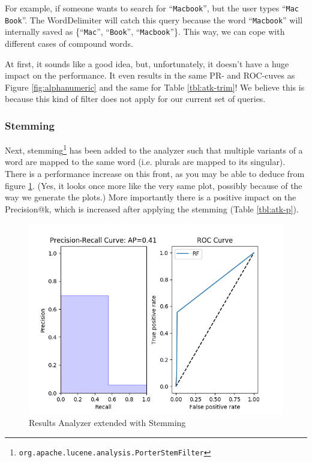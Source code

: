 \documentclass[11pt]{article}
\begin{document}
For example, if someone wants to search for ``\texttt{Macbook}'', but the user types ``\texttt{Mac Book}''. The WordDelimiter will catch this query because the word ``\texttt{Macbook}'' will internally saved as \{``\texttt{Mac}'', ``\texttt{Book}'', ``\texttt{Macbook}''\}. This way, we can cope with different cases of compound words.

At first, it sounds like a good idea, but, unfortunately, it doesn't have a huge impact on the performance. It even results in the same PR- and ROC-cuves as Figure \ref{fig:alphanumeric} and the same for Table \ref{tbl:atk-trim}! We believe this is because this kind of filter does not apply for our current set of queries.

\subsubsection{Stemming}\label{sec:stemming}
Next, stemming\footnote{\texttt{org.apache.lucene.analysis.PorterStemFilter}} has been added to the analyzer such that multiple variants of a word are mapped to the same word (i.e. plurals are mapped to its singular). There is a performance increase on this front, as you may be able to deduce from figure \ref{fig:stemming}. (Yes, it looks once more like the very same plot, possibly because of the way we generate the plots.) More importantly there is a positive impact on the Precision@k, which is increased after applying the stemming (Table \ref{tbl:atk-p}).

\begin{figure}[htp]
    \centering
    \includegraphics[width=\textwidth]{images/2ndTerm/Porter+Trim+WordDelimiter}
    \caption{Results Analyzer extended with Stemming}
    \label{fig:stemming}
\end{figure}
\end{document}

